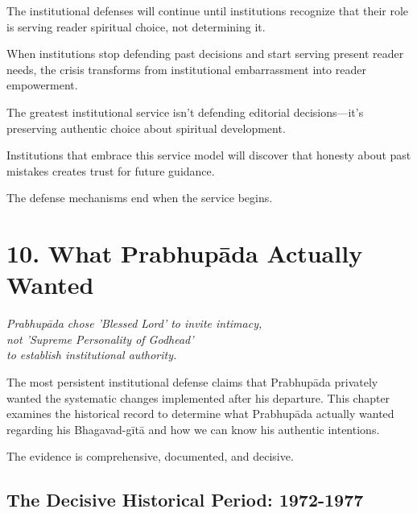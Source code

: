 \documentclass[11pt,twoside]{book}
\begin{document}
The institutional defenses will continue until institutions recognize that their role is serving reader spiritual choice, not determining it.

When institutions stop defending past decisions and start serving present reader needs, the crisis transforms from institutional embarrassment into reader empowerment.

The greatest institutional service isn't defending editorial decisions—it's preserving authentic choice about spiritual development.

Institutions that embrace this service model will discover that honesty about past mistakes creates trust for future guidance.

The defense mechanisms end when the service begins.
\chapter*{10. What Prabhupāda Actually Wanted}
\label{sec:org086cff1}

{\centering\itshape Prabhupāda chose 'Blessed Lord' to invite intimacy,\\not 'Supreme Personality of Godhead'\\to establish institutional authority.\par}
\vspace{0.3cm}

\normalfont\justifying
The most persistent institutional defense claims that Prabhupāda privately wanted the systematic changes implemented after his departure. This chapter examines the historical record to determine what Prabhupāda actually wanted regarding his Bhagavad-gītā and how we can know his authentic intentions.

The evidence is comprehensive, documented, and decisive.
\section*{The Decisive Historical Period: 1972-1977}
\label{sec:org42c7d28}
\end{document}
